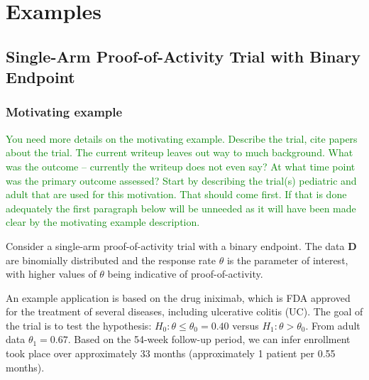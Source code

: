\documentclass[12pt]{article}
\begin{document}
%


\section{Examples}

\subsection{Single-Arm Proof-of-Activity Trial with Binary Endpoint}
\subsubsection{Motivating example}
\textcolor{green}{You need more details on the motivating example. Describe the trial, cite papers about the trial. 
%
The current writeup leaves out way to much background.
%
What was the outcome -- currently the writeup does not even say? At what time point was the primary outcome assessed?
%
Start by describing the trial(s) pediatric and adult that are used for this motivation. 
%
That should come first. If that is done adequately the first paragraph below will be unneeded as it will have been made clear by the motivating example description.
}

Consider a single-arm proof-of-activity trial with a binary endpoint. The data $\mathbf{D}$ are binomially distributed and the response rate $\theta$ is the parameter of interest, with higher values of $\theta$ being indicative of proof-of-activity. 

An example application is based on the drug iniximab, which is FDA approved for the treatment of several diseases, including ulcerative colitis (UC). The goal of the trial is to test the hypothesis: $H_0:\theta\leq\theta_0=0.40$ versus $H_1:\theta>\theta_0$. From adult data $\theta_1=0.67$. Based on the 54-week follow-up period, we can infer enrollment took place over approximately 33 months (approximately 1 patient per 0.55 months).
\end{document}
